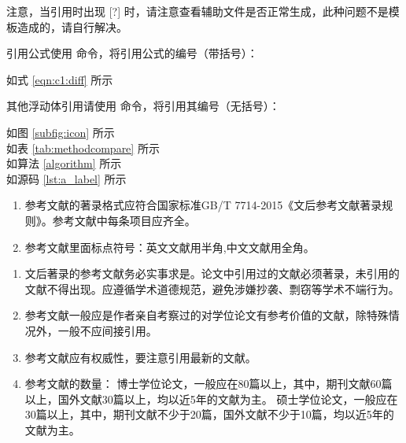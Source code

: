 

注意，当引用时出现 [?] 时，请注意查看辅助文件是否正常生成，此种问题不是模板造成的，请自行解决。



引用公式使用 \clist{\eqref{label}} 命令，将引用公式的编号（带括号）：

\begin{texcode}[]{}
  如式 \eqref{eqn:c1:diff} 所示
\end{texcode}


其他浮动体引用请使用 \clist{\ref{label}} 命令，将引用其编号（无括号）：

\begin{texcode}[]{}
  如图 \ref{subfig:icon} 所示 \\
  如表 \ref{tab:methodcompare} 所示 \\
  如算法 \ref{algorithm} 所示 \\
  如源码 \ref{lst:a_label} 所示
\end{texcode}



\begin{tcolorbox}[colback=red!5!white,colframe=red!75!black]
  \begin{enumerate}[leftmargin=0.5cm]
    \item 参考文献的著录格式应符合国家标准GB/T 7714-2015《文后参考文献著录规则》。参考文献中每条项目应齐全。
    \item 参考文献里面标点符号：英文文献用半角,中文文献用全角。
  \end{enumerate}
\end{tcolorbox}

\begin{tcolorbox}[colback=blue!5!white,colframe=blue!75!black]
  \begin{enumerate}[leftmargin=0.5cm]
    \item 文后著录的参考文献务必实事求是。论文中引用过的文献必须著录，未引用的文献不得出现。应遵循学术道德规范，避免涉嫌抄袭、剽窃等学术不端行为。
    \item 参考文献一般应是作者亲自考察过的对学位论文有参考价值的文献，除特殊情况外，一般不应间接引用。
    \item 参考文献应有权威性，要注意引用最新的文献。
    \item 参考文献的数量：
    博士学位论文，一般应在80篇以上，其中，期刊文献60篇以上，国外文献30篇以上，均以近5年的文献为主。
    硕士学位论文，一般应在30篇以上，其中，期刊文献不少于20篇，国外文献不少于10篇，均以近5年的文献为主。
  \end{enumerate}
\end{tcolorbox}

